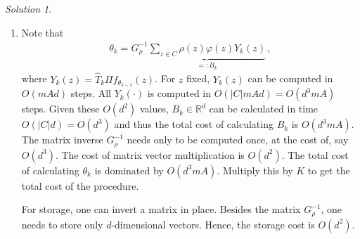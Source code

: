\documentclass{article}
\renewcommand{\phi}{\varphi}
\newcommand{\R}{\mathbb{R}}
\DeclareMathOperator*{\1}{\mathbbm{1}}
\newcommand{\0}{\mathbf{0}}
\theoremstyle{definition}
\theoremstyle{remark}
\newtheorem*{solution*}{Solution}
\begin{document}
\begin{solution*}
\mbox{}

\begin{enumerate}
\item 
Note that 
\begin{align}
\theta_k = G_{\rho}^{-1} \underbrace{\sum_{z\in C} \rho(z) \phi(z) Y_k(z)}_{=:B_k}\,,
\label{eq:lstk}
\end{align}
where 
$Y_k(z) = \hat T_k \Pi f_{\theta_{k-1}}(z)$.
For $z$ fixed, $Y_k(z)$ can be computed in $O(m A d)$ steps.
All $Y_k(\cdot)$ is computed in $O(|C|mA d) = O(d^3 m A)$ steps. Given these $O(d^2)$ values, $B_k\in \R^d$ can be calculated in time $O(|C|d) = O(d^3)$ and 
thus the total cost of calculating $B_k$ is $O(d^3 m A)$.
The matrix inverse $G_\rho^{-1}$ needs only to be computed once, at the cost of, say $O(d^3)$.
The cost of matrix vector multiplication is $O(d^2)$.
The total cost of calculating $\theta_k$ is dominated by $O(d^3 m A)$.
Multiply this by $K$ to get the total cost of the procedure.

For storage, one can invert a matrix in place. Besides the matrix $G_\rho^{-1}$, one needs to store only $d$-dimensional vectors.
Hence, the storage cost is $O(d^2)$.


\end{enumerate}
\end{solution*}
\end{document}
